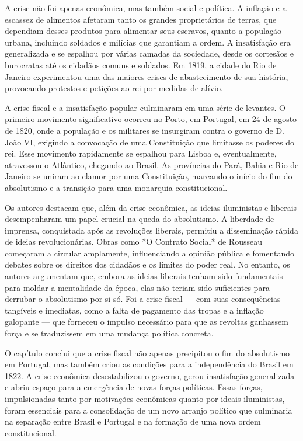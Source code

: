\documentclass[a4paper,12pt]{article}[abntex2]
\begin{document}
A crise não foi apenas econômica, mas também social e política. A inflação e a escassez de alimentos afetaram tanto os grandes proprietários de terras, que dependiam desses produtos para alimentar seus escravos, quanto a população urbana, incluindo soldados e milícias que garantiam a ordem. A insatisfação era generalizada e se espalhou por várias camadas da sociedade, desde os cortesãos e burocratas até os cidadãos comuns e soldados. Em 1819, a cidade do Rio de Janeiro experimentou uma das maiores crises de abastecimento de sua história, provocando protestos e petições ao rei por medidas de alívio.

A crise fiscal e a insatisfação popular culminaram em uma série de levantes. O primeiro movimento significativo ocorreu no Porto, em Portugal, em 24 de agosto de 1820, onde a população e os militares se insurgiram contra o governo de D. João VI, exigindo a convocação de uma Constituição que limitasse os poderes do rei. Esse movimento rapidamente se espalhou para Lisboa e, eventualmente, atravessou o Atlântico, chegando ao Brasil. As províncias do Pará, Bahia e Rio de Janeiro se uniram ao clamor por uma Constituição, marcando o início do fim do absolutismo e a transição para uma monarquia constitucional.

Os autores destacam que, além da crise econômica, as ideias iluministas e liberais desempenharam um papel crucial na queda do absolutismo. A liberdade de imprensa, conquistada após as revoluções liberais, permitiu a disseminação rápida de ideias revolucionárias. Obras como *O Contrato Social* de Rousseau começaram a circular amplamente, influenciando a opinião pública e fomentando debates sobre os direitos dos cidadãos e os limites do poder real. No entanto, os autores argumentam que, embora as ideias liberais tenham sido fundamentais para moldar a mentalidade da época, elas não teriam sido suficientes para derrubar o absolutismo por si só. Foi a crise fiscal — com suas consequências tangíveis e imediatas, como a falta de pagamento das tropas e a inflação galopante — que forneceu o impulso necessário para que as revoltas ganhassem força e se traduzissem em uma mudança política concreta.

O capítulo conclui que a crise fiscal não apenas precipitou o fim do absolutismo em Portugal, mas também criou as condições para a independência do Brasil em 1822. A crise econômica desestabilizou o governo, gerou insatisfação generalizada e abriu espaço para a emergência de novas forças políticas. Essas forças, impulsionadas tanto por motivações econômicas quanto por ideais iluministas, foram essenciais para a consolidação de um novo arranjo político que culminaria na separação entre Brasil e Portugal e na formação de uma nova ordem constitucional.
\end{document}
